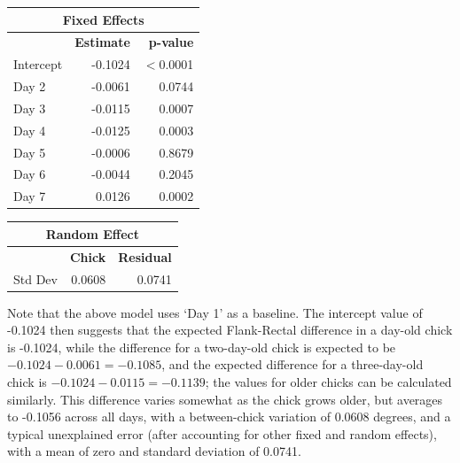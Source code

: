 \documentclass[a4paper, 10pt, titlepage]{article}
\newcommand\Tstrut{\rule{0pt}{2.9ex}}         %
\newcommand\Bstrut{\rule[-1.2ex]{0pt}{0pt}}   %
\begin{document}
\begin{table}[ht]
\centering
{} 
\begin{tabular}[t]{lrr}
 \hline
 \multicolumn{3}{c}{\textbf{Fixed Effects}}\\
 \hline
 & \textbf{Estimate} & \textbf{p-value}\Tstrut\\ 
 Intercept & -0.1024 & $<$0.0001\\
 Day 2 & -0.0061 & 0.0744\\
 Day 3 & -0.0115 & 0.0007\\
 Day 4 & -0.0125 & 0.0003\\
 Day 5 & -0.0006 & 0.8679\\
 Day 6 & -0.0044 & 0.2045\\
 Day 7 & 0.0126 & 0.0002\\
 \hline
\end{tabular}
\quad
\begin{tabular}[t]{lrr}
 \hline
\multicolumn{3}{c}{\textbf{Random Effect}}\\
 \hline
 & \textbf{Chick} & \textbf{Residual}\Tstrut \\ 
 Std Dev & 0.0608 & 0.0741\Bstrut\\
 \hline
\end{tabular}
\label{table:Est FR rel}
\end{table}

Note that the above model uses `Day 1' as a baseline. The intercept value of -0.1024 then suggests that the expected Flank-Rectal difference in a day-old chick is -0.1024, while the difference for a two-day-old chick is expected to be $-0.1024 - 0.0061 = -0.1085$, and the expected difference for a three-day-old chick is $-0.1024 - 0.0115 = -0.1139$; the values for older chicks can be calculated similarly. This difference varies somewhat as the chick grows older, but averages to -0.1056 across all days, with a between-chick variation of 0.0608 degrees, and a typical unexplained error (after accounting for other fixed and random effects), with a mean of zero and standard deviation of 0.0741. 
\end{document}
